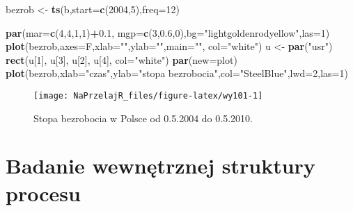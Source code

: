 \documentclass[polish,]{book}
\newenvironment{Shaded}{\begin{snugshade}}{\end{snugshade}}
\newcommand{\DataTypeTok}[1]{\textcolor[rgb]{0.13,0.29,0.53}{#1}}
\newcommand{\DecValTok}[1]{\textcolor[rgb]{0.00,0.00,0.81}{#1}}
\newcommand{\FloatTok}[1]{\textcolor[rgb]{0.00,0.00,0.81}{#1}}
\newcommand{\KeywordTok}[1]{\textcolor[rgb]{0.13,0.29,0.53}{\textbf{#1}}}
\newcommand{\NormalTok}[1]{#1}
\newcommand{\OperatorTok}[1]{\textcolor[rgb]{0.81,0.36,0.00}{\textbf{#1}}}
\newcommand{\StringTok}[1]{\textcolor[rgb]{0.31,0.60,0.02}{#1}}
\begin{document}
\begin{Shaded}
\begin{Highlighting}[]
\NormalTok{bezrob <-}\StringTok{ }\KeywordTok{ts}\NormalTok{(b,}\DataTypeTok{start=}\KeywordTok{c}\NormalTok{(}\DecValTok{2004}\NormalTok{,}\DecValTok{5}\NormalTok{),}\DataTypeTok{freq=}\DecValTok{12}\NormalTok{)}
\end{Highlighting}
\end{Shaded}

\begin{Shaded}
\begin{Highlighting}[]
\KeywordTok{par}\NormalTok{(}\DataTypeTok{mar=}\KeywordTok{c}\NormalTok{(}\DecValTok{4}\NormalTok{,}\DecValTok{4}\NormalTok{,}\DecValTok{1}\NormalTok{,}\DecValTok{1}\NormalTok{)}\OperatorTok{+}\FloatTok{0.1}\NormalTok{, }\DataTypeTok{mgp=}\KeywordTok{c}\NormalTok{(}\DecValTok{3}\NormalTok{,}\FloatTok{0.6}\NormalTok{,}\DecValTok{0}\NormalTok{),}\DataTypeTok{bg=}\StringTok{"lightgoldenrodyellow"}\NormalTok{,}\DataTypeTok{las=}\DecValTok{1}\NormalTok{)}
\KeywordTok{plot}\NormalTok{(bezrob,}\DataTypeTok{axes=}\NormalTok{F,}\DataTypeTok{xlab=}\StringTok{""}\NormalTok{,}\DataTypeTok{ylab=}\StringTok{""}\NormalTok{,}\DataTypeTok{main=}\StringTok{""}\NormalTok{, }\DataTypeTok{col=}\StringTok{"white"}\NormalTok{)}
\NormalTok{u <-}\StringTok{ }\KeywordTok{par}\NormalTok{(}\StringTok{"usr"}\NormalTok{)}
\KeywordTok{rect}\NormalTok{(u[}\DecValTok{1}\NormalTok{], u[}\DecValTok{3}\NormalTok{], u[}\DecValTok{2}\NormalTok{], u[}\DecValTok{4}\NormalTok{], }\DataTypeTok{col=}\StringTok{"white"}\NormalTok{)}
\KeywordTok{par}\NormalTok{(}\DataTypeTok{new=}\NormalTok{plot)}
\KeywordTok{plot}\NormalTok{(bezrob,}\DataTypeTok{xlab=}\StringTok{"czas"}\NormalTok{,}\DataTypeTok{ylab=}\StringTok{"stopa bezrobocia"}\NormalTok{,}\DataTypeTok{col=}\StringTok{"SteelBlue"}\NormalTok{,}\DataTypeTok{lwd=}\DecValTok{2}\NormalTok{,}\DataTypeTok{las=}\DecValTok{1}\NormalTok{)}
\end{Highlighting}
\end{Shaded}

\begin{figure}[h]

{\centering \texttt{[image: NaPrzelajR\_files/figure-latex/wy101-1]} 

}

\caption{Stopa bezrobocia w Polsce od 0.5.2004 do 0.5.2010.}\label{fig:wy101}
\end{figure}

\hypertarget{part_10.2}{%
\section{Badanie wewnętrznej struktury procesu}\label{part_10.2}}
\end{document}
